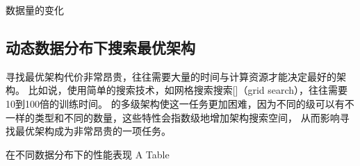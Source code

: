数据量的变化

\subsection{动态数据分布下搜索最优{\li}架构}

寻找最优{\li}架构代价非常昂贵，往往需要大量的时间与计算资源才能决定最好的{\li}架构。
比如说，使用简单的搜索技术，如网格搜索搜索[]（grid search），往往需要10到100倍的训练时间。
{\li}的多级架构使这一任务更加困难，因为不同的级可以有不一样的{\model}类型和不同的{\model}数量，这些特性会指数级地增加架构搜索空间，
从而影响寻找最优{\li}架构成为非常昂贵的一项任务。

% 

\begin{table}[!hpb]
  \centering
  \bicaption[指向一个表格的表目录索引]
    {{\li}在不同数据分布下的性能表现}
    {A Table}
  \label{tab:dist}
  \begin{tabular}{@{}llr@{}} \toprule
  \end{tabular}
\end{table}

